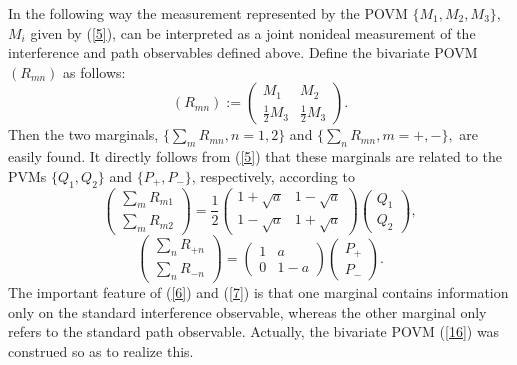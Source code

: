 \documentclass[12pt]{article}
\begin{document}
{In the following way the measurement represented by the POVM
$\{M_1,M_2,M_3\}$, $M_i$ given by (\ref{5}), can be interpreted as
a joint nonideal measurement of the interference and path
observables defined above. Define the bivariate POVM $(R_{mn})$ as
follows:
\begin{equation} \label{16} (R_{mn}):=\left(\begin{array}{cc}
M_1 & M_2\\
\frac{1}{2}M_{3} & \frac{1}{2}M_{3}
\end{array}\right).\end{equation}
Then the two marginals, $\{\sum_{m} R_{mn}, n=1,2\}$ and
$\{\sum_{n} R_{mn}, m=+,-\},$ are easily found. It directly
follows from (\ref{5}) that these marginals are related to the
PVMs $\{Q_1,Q_2\}$ and $\{P_+,P_-\}$, respectively, according to
\begin{equation}\label{6}\left(\begin{array}{c}
\sum_{m} R_{m1}\\
\sum_{m} R_{m2}\end{array}\right) =\frac{1}{2}
\left(\begin{array}{cc}
1+\sqrt{a} & 1-\sqrt{a}\\
1-\sqrt{a} & 1+\sqrt{a}\end{array}\right) \left(\begin{array}{c}
Q_1\\
Q_2\end{array}\right), \end{equation}
 \begin{equation}\label{7}
\left(\begin{array}{c}
\sum_{n} R_{+n}\\
\sum_{n} R_{-n}\end{array}\right)= \left(\begin{array}{cc}
1 & a\\
0 & 1-a
\end{array}\right)
\left(\begin{array}{c}
P_+\\
P_-
\end{array}\right).\end{equation}
The important feature of (\ref{6}) and (\ref{7}) is that one
marginal contains information only on the standard interference
observable, whereas the other marginal only refers to the standard
path observable. Actually, the bivariate POVM (\ref{16}) was
construed so as to realize this.

}
\end{document}

